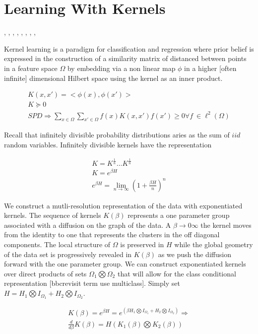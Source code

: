 \section{Learning With Kernels}


\cite{KLBurges98atutorial}, \cite{KLKeerthi99improvementsto}, \cite{KLProgramminglearningthe},
\cite{KLScholkopf00newsupport}, \cite{KLScholkopf00statisticallearning}, \cite{KLShevade99improvementsto},
\cite{KLTsang03distancemetric}, \cite{KLWeston00featureselection}, \cite{KLSchultz03learninga}

Kernel learning is a paradigm for classification and regression where prior belief is expressed in the construction of a similarity matrix of distanced between points in a feature space $\Omega$ by embedding via a non linear map $\phi$ in a higher [often infinite] dimensional Hilbert space using the kernel as an inner product.
\begin{center}\begin{eqnarray*}
  K(x,x')= <\phi(x),\phi(x')> \\
  K \succeq 0 \\
  SPD \Rightarrow \sum\limits_{x \in \Omega}^{}  \sum\limits_{x' \in \Omega}^{} f(x) K(x,x') f(x') \geq 0 \forall f\ \in \ell^2(\Omega)
\end{eqnarray*}\end{center}
Recall that infinitely divisible probability distributions aries as the sum of $iid$ random variables.  Infinitely divisible kernels have the representation
\begin{center}\begin{eqnarray*}
K=K^{\frac{1}{n}} \ldots K^{\frac{1}{n}} \\
K= e^{\beta H} \\
e^{\beta H} = \lim\limits_{n\rightarrow \infty} (1+ \frac{\beta H}{n} )^n
\end{eqnarray*}\end{center}
We construct a mutli-resolution representation of the data with exponentiated kernels.  The sequence of kernels $K(\beta)$ represents a one parameter group associated with a diffusion on the graph of the data.  A $\beta \rightarrow  0 \infty$ the kernel moves from the identity to one that represents the clusters in the off diagonal components.  The local structure of $\Omega$ is preserved in $H$ while the global geometry of the data set is progressively revealed in $K(\beta)$ as we push the diffusion forward with the one parameter group.  We can construct exponentiated kernels over direct products of sets $\Omega_1 \bigotimes \Omega_2$ that will allow for the class conditional representation [bbcrevisit term use multiclass].  Simply set $H = H_1 \bigotimes I_{\Omega_1} +  H_2 \bigotimes I_{\Omega_2}$.
\begin{center}\begin{eqnarray*}
K(\beta) = e^{\beta H} =  e^{(\beta H_1 \bigotimes I_{\Omega_1} +  H_2 \bigotimes I_{\Omega_2})} \Rightarrow \\
\frac{d}{d \beta} K(\beta) =  H (K_1(\beta) \bigotimes K_2(\beta))
\end{eqnarray*}\end{center}


